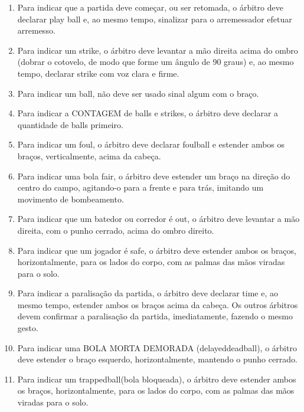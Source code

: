\begin{enumerate}[label=(\alph*)]
	\item  Para indicar que a partida deve começar, ou ser retomada, o árbitro deve declarar \gls{play ball} e, ao mesmo tempo, sinalizar para o arremessador efetuar arremesso.
	\item Para indicar um \gls{strike}, o árbitro deve levantar a mão direita acima do ombro (dobrar o cotovelo, de modo que forme um ângulo de 90 graus) e, ao mesmo tempo, declarar \gls{strike} com voz clara e firme.
	\item Para indicar um \gls{ball}, não deve ser usado sinal algum com o braço.
	\item Para indicar a CONTAGEM de \glspl{ball} e \glspl{strike}, o árbitro deve declarar a quantidade de \glspl{ball} primeiro.
	\item Para indicar um \gls{foul}, o árbitro deve declarar \gls{foulball} e estender ambos os braços, verticalmente, acima da cabeça.
	\item Para indicar uma bola \gls{fair}, o árbitro deve estender um braço na direção do centro do campo, agitando-o para a frente e para trás, imitando um movimento de bombeamento.
	\item  Para indicar que um batedor ou corredor é \gls{out}, o árbitro deve levantar a mão direita, com o punho cerrado, acima do ombro direito.
	\item  Para indicar que um jogador é \gls{safe}, o árbitro deve estender ambos os braços, horizontalmente, para os lados do corpo, com as palmas das mãos viradas para o solo.

	\item Para indicar a paralisação da partida, o árbitro deve declarar \gls{time} e, ao mesmo tempo, estender ambos os braços acima da cabeça. Os outros árbitros devem confirmar a paralisação da partida, imediatamente, fazendo o mesmo gesto.

	\item  Para indicar uma BOLA MORTA DEMORADA (\gls{delayeddeadball}), o árbitro deve estender o braço esquerdo, horizontalmente, mantendo o punho cerrado.
	\item  Para indicar um \gls{trappedball}(bola bloqueada), o árbitro deve estender ambos os braços, horizontalmente, para os lados do corpo, com as palmas das mãos viradas para o solo.


\end{enumerate}
